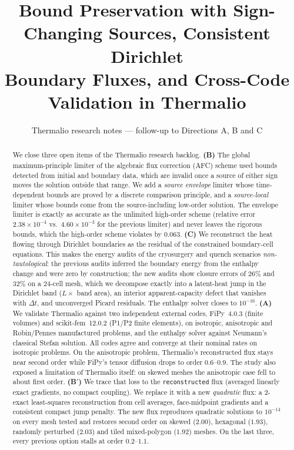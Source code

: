 \documentclass[11pt]{article}
\title{Bound Preservation with Sign-Changing Sources, Consistent Dirichlet\\
Boundary Fluxes, and Cross-Code Validation in Thermalio}
\author{Thermalio research notes --- follow-up to Directions A, B and C}
\date{}
\numberwithin{equation}{section}
\theoremstyle{remark}
\begin{document}
\maketitle

\begin{abstract}
We close three open items of the Thermalio research backlog.
\textbf{(B)} The global maximum-principle limiter of the algebraic flux
correction (AFC) scheme used bounds detected from initial and boundary data,
which are invalid once a source of either sign moves the solution outside that
range.  We add a \emph{source envelope} limiter whose time-dependent bounds are
proved by a discrete comparison principle, and a \emph{source-local} limiter
whose bounds come from the source-including low-order solution.  The envelope
limiter is exactly as accurate as the unlimited high-order scheme (relative
error $2.38\times10^{-4}$ vs.\ $4.60\times10^{-3}$ for the previous limiter) and
never leaves the rigorous bounds, which the high-order scheme violates by $0.063$.
\textbf{(C)} We reconstruct the heat flowing through Dirichlet boundaries as
the residual of the constrained boundary-cell equations.  This makes the
energy audits of the cryosurgery and quench scenarios \emph{non-tautological}:
the previous audits inferred the boundary energy from the enthalpy change and
were zero by construction; the new audits show closure errors of $26\%$ and
$32\%$ on a $24$-cell mesh, which we decompose exactly into a latent-heat jump in
the Dirichlet band ($L\times$ band area), an interior apparent-capacity defect
that vanishes with $\Delta t$, and unconverged Picard residuals.  The enthalpy
solver closes to $10^{-16}$.
\textbf{(A)} We validate Thermalio against two independent external codes,
FiPy~4.0.3 (finite volumes) and scikit-fem~12.0.2 (P1/P2 finite elements), on
isotropic, anisotropic and Robin/Pennes manufactured problems, and the enthalpy
solver against Neumann's classical Stefan solution.  All codes agree and
converge at their nominal rates on isotropic problems.  On the anisotropic
problem, Thermalio's reconstructed flux stays near second order while FiPy's
tensor diffusion drops to order $0.6$--$0.9$.  The study also exposed a
limitation of Thermalio itself: on skewed meshes the anisotropic case fell to
about first order.
\textbf{(B$'$)} We trace that loss to the \texttt{reconstructed} flux (averaged
linearly exact gradients, no compact coupling).  We replace it with a new
\emph{quadratic} flux: a 2-exact least-squares reconstruction from cell
averages, face-midpoint gradients and a consistent compact jump penalty.  The
new flux reproduces quadratic solutions to $10^{-14}$ on every mesh tested and
restores second order on skewed ($2.00$), hexagonal ($1.93$), randomly perturbed
($2.03$) and tiled mixed-polygon ($1.92$) meshes.  On the last three, every
previous option stalls at order $0.2$--$1.1$.
\end{abstract}
\end{document}
